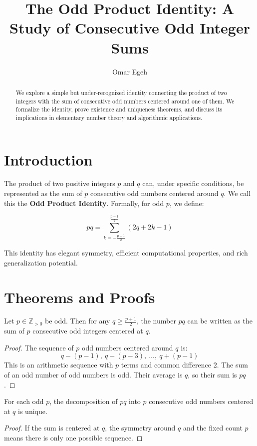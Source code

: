\documentclass[12pt]{article}
\title{The Odd Product Identity: A Study of Consecutive Odd Integer Sums}
\author{Omar Egeh}
\date{}
\begin{document}
\maketitle

\begin{abstract}
We explore a simple but under-recognized identity connecting the product of two integers with the sum of consecutive odd numbers centered around one of them. We formalize the identity, prove existence and uniqueness theorems, and discuss its implications in elementary number theory and algorithmic applications.
\end{abstract}

\section{Introduction}

The product of two positive integers \( p \) and \( q \) can, under specific conditions, be represented as the sum of \( p \) consecutive odd numbers centered around \( q \). We call this the \textbf{Odd Product Identity}. Formally, for odd \( p \), we define:

\[
pq = \sum_{k = -\frac{p-1}{2}}^{\frac{p-1}{2}} (2q + 2k - 1)
\]

This identity has elegant symmetry, efficient computational properties, and rich generalization potential.

\section{Theorems and Proofs}

\begin{theorem}
Let \( p \in \mathbb{Z}_{>0} \) be odd. Then for any \( q \geq \frac{p+1}{2} \), the number \( pq \) can be written as the sum of \( p \) consecutive odd integers centered at \( q \).
\end{theorem}

\begin{proof}
The sequence of \( p \) odd numbers centered around \( q \) is:
\[
q - (p - 1),\ q - (p - 3),\ \ldots,\ q + (p - 1)
\]
This is an arithmetic sequence with \( p \) terms and common difference 2. The sum of an odd number of odd numbers is odd. Their average is \( q \), so their sum is \( pq \).
\end{proof}

\begin{theorem}[Uniqueness]
For each odd \( p \), the decomposition of \( pq \) into \( p \) consecutive odd numbers centered at \( q \) is unique.
\end{theorem}

\begin{proof}
If the sum is centered at \( q \), the symmetry around \( q \) and the fixed count \( p \) means there is only one possible sequence.
\end{proof}
\end{document}

